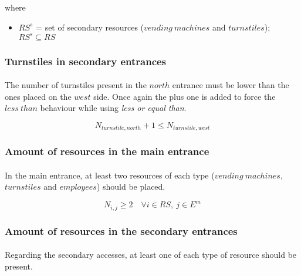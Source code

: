 where

\begin{itemize}
    \item[] $RS^s$ = set of secondary resources ($vending\ machines$ and $turnstiles$); $RS^s \subseteq RS$
\end{itemize}








\subsubsection{Turnstiles in secondary entrances}

\paragraph{}
The number of turnstiles present in the $north$ entrance must be lower than the ones placed on the $west$ side.
Once again the plus one is added to force the $less\ than$ behaviour while using \textit{less or equal than}.

\begin{equation}
    N_{turnstile,north} + 1 \leq N_{turnstile,west}
\end{equation}





\subsubsection{Amount of resources in the main entrance}

\paragraph{}
In the main entrance, at least two resources of each type ($vending\ machines$, $turnstiles$ and $employees$) should be placed.

\begin{equation}
    N_{i,j} \geq 2 \quad \forall i \in RS,\ j \in E^m
\end{equation}




\subsubsection{Amount of resources in the secondary entrances}

\paragraph{}
Regarding the secondary accesses, at least one of each type of resource should be present.

